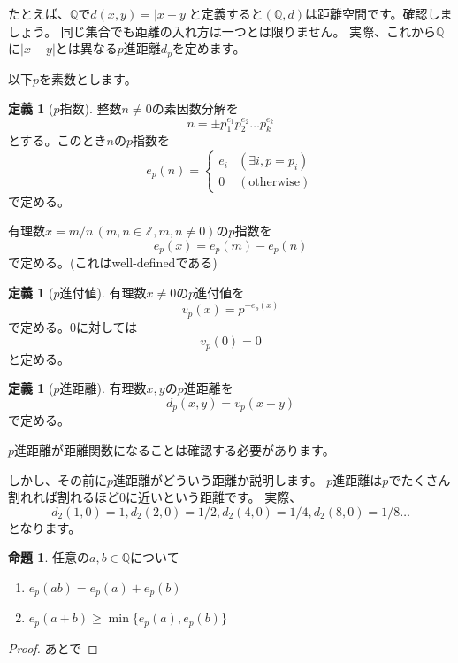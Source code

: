 \documentclass[uplatex]{jsarticle}
\newcommand{\Z}{\mathbb{Z}}
\newcommand{\Q}{\mathbb{Q}}
\theoremstyle{definition} %
\newtheorem{defi}[thm]{定義}
\newtheorem{prop}[thm]{命題}
\begin{document}
たとえば、$\Q$で$d(x, y) = |x - y|$と定義すると$(\Q, d)$は距離空間です。確認しましょう。
同じ集合でも距離の入れ方は一つとは限りません。
実際、これから$\Q$に$|x - y|$とは異なる$p$進距離$d_p$を定めます。

以下$p$を素数とします。

\begin{oframed}\begin{defi}[$p$指数]
整数$n \ne 0$の素因数分解を
\[n = \pm p_1^{e_1} p_2^{e_2} \dots p_k^{e_k}\]
とする。このとき$n$の$p$指数を
\[e_p(n) = \begin{cases}e_i & (\exists i, p = p_i) \\ 0 & (\text{otherwise}) \end{cases} \]
で定める。

有理数$x = m/n\,(m,n \in \Z, m, n \ne 0)$の$p$指数を
\[e_p(x) = e_p(m) - e_p(n)\]
で定める。(これはwell-definedである)
\end{defi}\end{oframed}

\begin{oframed}\begin{defi}[$p$進付値]
有理数$x \ne 0$の$p$進付値を
\[v_p(x) = p^{-e_p(x)}\]
で定める。$0$に対しては
\[v_p(0) = 0\]
と定める。
\end{defi}\end{oframed}

\begin{oframed}\begin{defi}[$p$進距離]
有理数$x, y$の$p$進距離を
\[d_p(x, y) = v_p(x - y)\]
で定める。
\end{defi}\end{oframed}

$p$進距離が距離関数になることは確認する必要があります。

しかし、その前に$p$進距離がどういう距離か説明します。
$p$進距離は$p$でたくさん割れれば割れるほど$0$に近いという距離です。
実際、
\[d_2(1, 0) = 1, d_2(2, 0) = 1/2, d_2(4, 0) = 1/4, d_2(8, 0) = 1/8 \dots\]
となります。

\begin{oframed}\begin{prop}\label{prop:1}
任意の$a, b \in \Q$について
\begin{enumerate}
\item $e_p(ab) = e_p(a) + e_p(b)$
\item $e_p(a+b) \geq \min\{e_p(a), e_p(b)\}$
\end{enumerate}
\end{prop}\end{oframed}
\begin{proof}
あとで
\end{proof}
\end{document}
